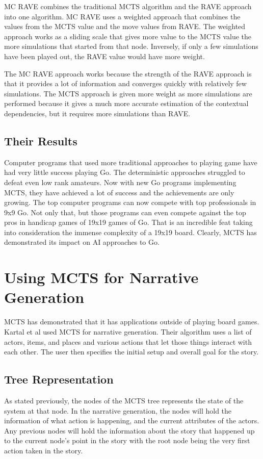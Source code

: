 \documentclass{sig-alternate}
\begin{document}
MC RAVE combines the traditional MCTS algorithm and the RAVE approach into one algorithm. MC RAVE uses a weighted approach that combines the values from the MCTS value and the move values from RAVE. The weighted approach works as a sliding scale that gives more value to the MCTS value the more simulations that started from that node\cite{RAVEinGo}. Inversely, if only a few simulations have been played out, the RAVE value would have more weight.

The MC RAVE approach works because the strength of the RAVE approach is that it provides a lot of information and converges quickly with relatively few simulations. The MCTS approach is given more weight as more simulations are performed because it gives a much more accurate estimation of the contextual dependencies, but it requires more simulations than RAVE.

\subsection{Their Results}
Computer programs that used more traditional approaches to playing game have had very little success playing Go. The deterministic approaches struggled to defeat even low rank amateurs. Now with new Go programs implementing MCTS, they have achieved a lot of success and the achievements are only growing. The top computer programs can now compete with top professionals in 9x9 Go\cite{RAVEinGo}. Not only that, but those programs can even compete against the top pros in handicap games of 19x19 games of Go. That is an incredible feat taking into consideration the immense complexity of a 19x19 board. Clearly, MCTS has demonstrated its impact on AI approaches to Go.

\section{Using MCTS for Narrative Generation}
MCTS has demonstrated that it has applications outside of playing board games. Kartal et al\cite{Narrative} used MCTS for narrative generation. Their algorithm uses a list of actors, items, and places and various actions that let those things interact with each other. The user then specifies the initial setup and overall goal for the story.

\subsection{Tree Representation}
As stated previously, the nodes of the MCTS tree represents the state of the system at that node. In the narrative generation, the nodes will hold the information of what action is happening, and the current attributes of the actors. Any previous nodes will hold the information about the story that happened up to the current node's point in the story with the root node being the very first action taken in the story.
\end{document}
